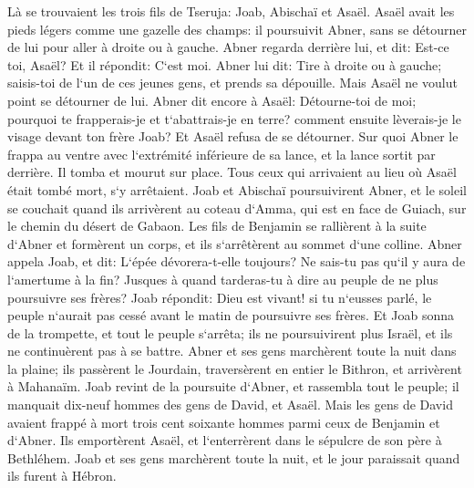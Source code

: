 \verse Là se trouvaient les trois fils de Tseruja: Joab, Abischaï et Asaël. Asaël avait les pieds légers comme une gazelle des champs: 
\verse il poursuivit Abner, sans se détourner de lui pour aller à droite ou à gauche. 
\verse Abner regarda derrière lui, et dit: Est-ce toi, Asaël? Et il répondit: C`est moi. 
\verse Abner lui dit: Tire à droite ou à gauche; saisis-toi de l`un de ces jeunes gens, et prends sa dépouille. Mais Asaël ne voulut point se détourner de lui. 
\verse Abner dit encore à Asaël: Détourne-toi de moi; pourquoi te frapperais-je et t`abattrais-je en terre? comment ensuite lèverais-je le visage devant ton frère Joab? 
\verse Et Asaël refusa de se détourner. Sur quoi Abner le frappa au ventre avec l`extrémité inférieure de sa lance, et la lance sortit par derrière. Il tomba et mourut sur place. Tous ceux qui arrivaient au lieu où Asaël était tombé mort, s`y arrêtaient. 
\verse Joab et Abischaï poursuivirent Abner, et le soleil se couchait quand ils arrivèrent au coteau d`Amma, qui est en face de Guiach, sur le chemin du désert de Gabaon. 
\verse Les fils de Benjamin se rallièrent à la suite d`Abner et formèrent un corps, et ils s`arrêtèrent au sommet d`une colline. 
\verse Abner appela Joab, et dit: L`épée dévorera-t-elle toujours? Ne sais-tu pas qu`il y aura de l`amertume à la fin? Jusques à quand tarderas-tu à dire au peuple de ne plus poursuivre ses frères? 
\verse Joab répondit: Dieu est vivant! si tu n`eusses parlé, le peuple n`aurait pas cessé avant le matin de poursuivre ses frères. 
\verse Et Joab sonna de la trompette, et tout le peuple s`arrêta; ils ne poursuivirent plus Israël, et ils ne continuèrent pas à se battre. 
\verse Abner et ses gens marchèrent toute la nuit dans la plaine; ils passèrent le Jourdain, traversèrent en entier le Bithron, et arrivèrent à Mahanaïm. 
\verse Joab revint de la poursuite d`Abner, et rassembla tout le peuple; il manquait dix-neuf hommes des gens de David, et Asaël. 
\verse Mais les gens de David avaient frappé à mort trois cent soixante hommes parmi ceux de Benjamin et d`Abner. 
\verse Ils emportèrent Asaël, et l`enterrèrent dans le sépulcre de son père à Bethléhem. Joab et ses gens marchèrent toute la nuit, et le jour paraissait quand ils furent à Hébron. 

